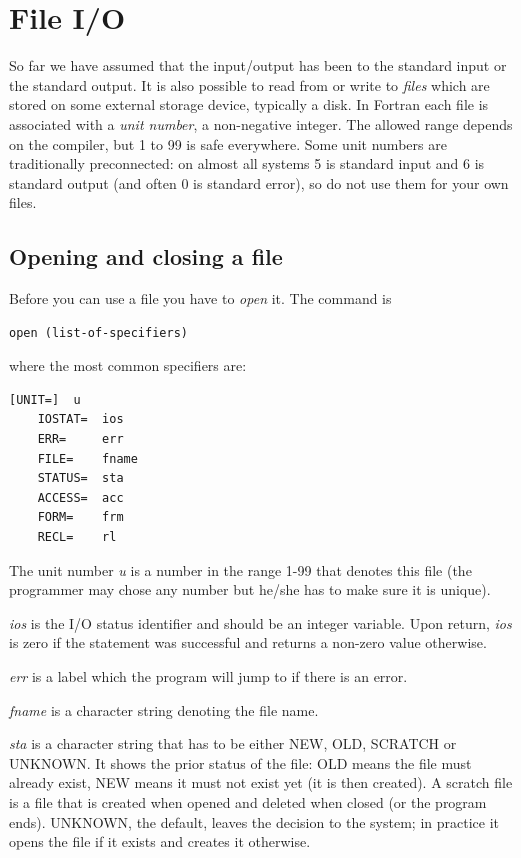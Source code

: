 \chapter{File I/O}

So far we have assumed that the input/output has been to the standard input or the standard output. It is also possible to read from or write to \emph{files} which are stored on some external storage device, typically a disk. In Fortran each file is associated with a \emph{unit number}, a non-negative integer. The allowed range depends on the compiler, but 1 to 99 is safe everywhere. Some unit numbers are traditionally preconnected: on almost all systems 5 is standard input and 6 is standard output (and often 0 is standard error), so do not use them for your own files.

\section{Opening and closing a file}

Before you can use a file you have to \emph{open} it. The command is

\begin{lstlisting}[style=fortran77]
    open (list-of-specifiers)
\end{lstlisting}

where the most common specifiers are:

\begin{lstlisting}[style=fortran77]
    [UNIT=]  u
    IOSTAT=  ios
    ERR=     err
    FILE=    fname
    STATUS=  sta
    ACCESS=  acc
    FORM=    frm
    RECL=    rl
\end{lstlisting}

The unit number \emph{u} is a number in the range 1-99 that denotes this file (the programmer may chose any number but he/she has to make sure it is unique).

\emph{ios} is the I/O status identifier and should be an integer variable. Upon return, \emph{ios} is zero if the statement was successful and returns a non-zero value otherwise.

\emph{err} is a label which the program will jump to if there is an error.

\emph{fname} is a character string denoting the file name.

\emph{sta} is a character string that has to be either NEW, OLD, SCRATCH or UNKNOWN. It shows the prior status of the file: OLD means the file must already exist, NEW means it must not exist yet (it is then created). A scratch file is a file that is created when opened and deleted when closed (or the program ends). UNKNOWN, the default, leaves the decision to the system; in practice it opens the file if it exists and creates it otherwise.

